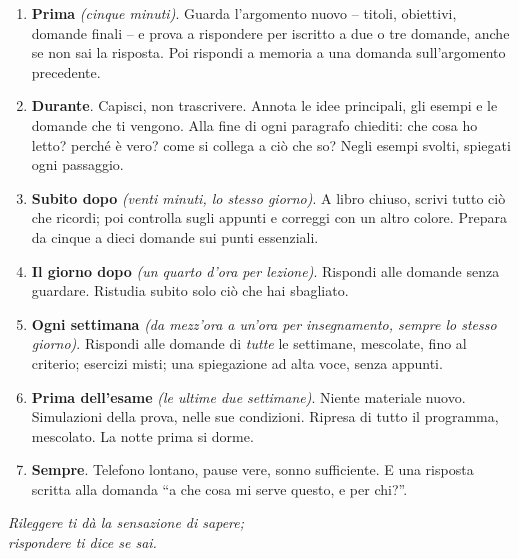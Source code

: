 
{\small
\begin{enumerate}[leftmargin=1.4em, itemsep=0.25\baselineskip]
  \item \textbf{Prima} \emph{(cinque minuti)}. Guarda l'argomento
        nuovo -- titoli, obiettivi, domande finali -- e prova a
        rispondere per iscritto a due o tre domande, anche se non sai
        la risposta. Poi rispondi a memoria a una domanda
        sull'argomento precedente.
  \item \textbf{Durante}. Capisci, non trascrivere. Annota le idee
        principali, gli esempi e le domande che ti vengono. Alla fine
        di ogni paragrafo chiediti: che cosa ho letto? perché è vero?
        come si collega a ciò che so? Negli esempi svolti, spiegati
        ogni passaggio.
  \item \textbf{Subito dopo} \emph{(venti minuti, lo stesso giorno)}.
        A libro chiuso, scrivi tutto ciò che ricordi; poi controlla
        sugli appunti e correggi con un altro colore. Prepara da cinque
        a dieci domande sui punti essenziali.
  \item \textbf{Il giorno dopo} \emph{(un quarto d'ora per lezione)}.
        Rispondi alle domande senza guardare. Ristudia subito solo ciò
        che hai sbagliato.
  \item \textbf{Ogni settimana} \emph{(da mezz'ora a un'ora per
        insegnamento, sempre lo stesso giorno)}. Rispondi alle domande
        di \emph{tutte} le settimane, mescolate, fino al criterio;
        esercizi misti; una spiegazione ad alta voce, senza appunti.
  \item \textbf{Prima dell'esame} \emph{(le ultime due settimane)}.
        Niente materiale nuovo. Simulazioni della prova, nelle sue
        condizioni. Ripresa di tutto il programma, mescolato. La notte
        prima si dorme.
  \item \textbf{Sempre}. Telefono lontano, pause vere, sonno
        sufficiente. E una risposta scritta alla domanda \enquote{a
        che cosa mi serve questo, e per chi?}.
\end{enumerate}}

\vspace{0.5\baselineskip}
{\centering\small\itshape Rileggere ti dà la sensazione di sapere;\\
rispondere ti dice se sai.\par}

